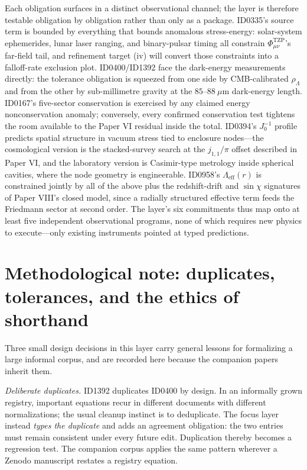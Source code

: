 \documentclass[11pt]{article}
\theoremstyle{remark}
\begin{document}
Each obligation surfaces in a distinct observational channel; the layer is therefore testable obligation by obligation rather than only as a package. ID0335's source term is bounded by everything that bounds anomalous stress-energy: solar-system ephemerides, lunar laser ranging, and binary-pulsar timing all constrain $\Phi^{\mathrm{TZP}}_{\mu\nu}$'s far-field tail, and refinement target (iv) will convert those constraints into a falloff-rate exclusion plot. ID0400/ID1392 face the dark-energy measurements directly: the tolerance obligation is squeezed from one side by CMB-calibrated $\rho_\Lambda$ and from the other by sub-millimetre gravity at the $85$--$88\ \mu$m dark-energy length. ID0167's five-sector conservation is exercised by any claimed energy nonconservation anomaly; conversely, every confirmed conservation test tightens the room available to the Paper VI residual inside the total. ID0394's $J_0^{-1}$ profile predicts spatial structure in vacuum stress tied to enclosure nodes---the cosmological version is the stacked-survey search at the $j_{1,1}/\pi$ offset described in Paper VI, and the laboratory version is Casimir-type metrology inside spherical cavities, where the node geometry is engineerable. ID0958's $\Lambda_{\mathrm{eff}}(r)$ is constrained jointly by all of the above plus the redshift-drift and $\sin\chi$ signatures of Paper VIII's closed model, since a radially structured effective term feeds the Friedmann sector at second order. The layer's six commitments thus map onto at least five independent observational programs, none of which requires new physics to execute---only existing instruments pointed at typed predictions.

\section{Methodological note: duplicates, tolerances, and the ethics of shorthand}
\label{sec:method}

Three small design decisions in this layer carry general lessons for formalizing a large informal corpus, and are recorded here because the companion papers inherit them.

\emph{Deliberate duplicates.} ID1392 duplicates ID0400 by design. In an informally grown registry, important equations recur in different documents with different normalizations; the usual cleanup instinct is to deduplicate. The focus layer instead \emph{types the duplicate} and adds an agreement obligation: the two entries must remain consistent under every future edit. Duplication thereby becomes a regression test. The companion corpus applies the same pattern wherever a Zenodo manuscript restates a registry equation.
\end{document}
